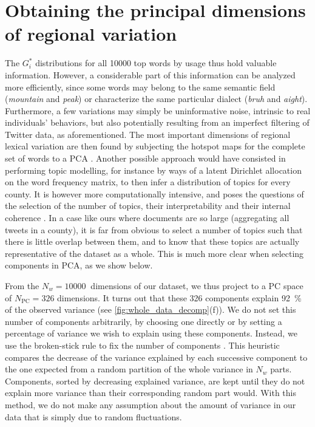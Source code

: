 \documentclass[../thesis.tex]{subfiles}
\begin{document}
\section{Obtaining the principal dimensions of regional variation}

The $G_i^*$ distributions for all \SI{10000}{} top words by usage thus hold valuable
information. However, a considerable part of this information can be analyzed more
efficiently, since some words may belong to the same semantic field (\textit{mountain}
and \textit{peak}) or characterize the same particular dialect (\textit{bruh} and
\textit{aight}). Furthermore, a few variations may simply be uninformative noise,
intrinsic to real individuals' behaviors, but also potentially resulting from an
imperfect filtering of Twitter data, as aforementioned. The most important dimensions of
regional lexical variation are then found by subjecting the hotspot maps for the
complete set of words to a \ac{PCA}
\cite{LieskeRegionalSubcultures1993,WoldPrincipalComponent1987}. Another possible
approach would have consisted in performing topic modelling, for instance by ways of a
latent Dirichlet allocation on the word frequency matrix, to then infer a distribution
of topics for every county. It is however more computationally intensive, and poses the
questions of the selection of the number of topics, their interpretability and their
internal coherence \cite{ArunFindingNatural2010,HasanNormalizedApproach2021}. In a case
like ours where documents are so large (aggregating all tweets in a county), it is far
from obvious to select a number of topics such that there is little overlap between
them, and to know that these topics are actually representative of the dataset as a
whole. This is much more clear when selecting components in \ac{PCA}, as we show
below.

From the $N_w = \SI{10000}{}$ dimensions of our dataset, we thus project to a \ac{PC}
space of $N_{\text{PC}} = 326$ dimensions. It turns out that these 326 components
explain 92~\% of the observed variance (see \cref{fig:whole_data_decomp}(f)). We do not
set this number of components arbitrarily, by choosing one directly or by setting a
percentage of variance we wish to explain using these components. Instead, we use the
broken-stick rule to fix the number of components
\cite{FrontierEtudeDecroissance1976,JacksonStoppingRules1993}. This heuristic compares
the decrease of the variance explained by each successive component to the one expected
from a random partition of the whole variance in $N_w$ parts. Components, sorted by
decreasing explained variance, are kept until they do not explain more variance than
their corresponding random part would. With this method, we do not make any assumption
about the amount of variance in our data that is simply due to random fluctuations.
\end{document}
